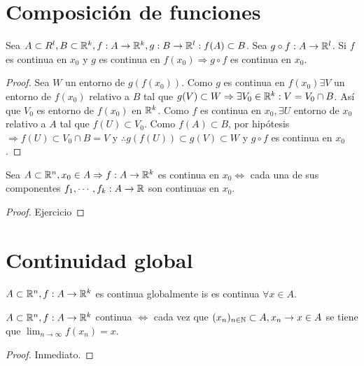 \section{Composición de funciones}

\begin{theorem}
  Sea $A \subset R^l, B \subset \mathbb{R}^k, f: A \to \mathbb{R}^k, g: B \to \mathbb{R}^l : f(A) \subset B$. Sea $g \circ f: A \to \mathbb{R}^l$. Si $f$ es continua en $x_0$ y $g$ es continua en $f(x_0) \Rightarrow g \circ f$ es continua en $x_0$.
  \begin{proof}
    Sea $W$ un entorno de $g(f(x_0))$. Como $g$ es continua en $f(x_0) \exists V$ un entorno de $f(x_0)$ relativo a $B$ tal que $g(V) \subset W \Rightarrow \exists V_0 \in \mathbb{R}^k : V = V_0 \cap B$. Así que $V_0$ es entorno de $f(x_0)$ en $\mathbb{R}^k$. Como $f$ es continua en $x_0, \exists U$ entorno de $x_0$ relativo a $A$ tal que $f(U) \subset V_0$. Como $f(A) \subset B$, por hipótesis $\Rightarrow f(U) \subset V_0 \cap B = V$ y $\therefore g(f(U)) \subset g(V) \subset W$ y $g \circ f$ es continua en $x_0$.
  \end{proof}
\end{theorem}

\begin{prop}
  Sea $A \subset \mathbb{R}^n, x_0 \in A \Rightarrow f: A \to \mathbb{R}^k$ es continua en $x_0 \iff$ cada una de sus componentes $f_1, \cdots, f_k: A \to \mathbb{R}$ son continuas en $x_0$.
  \begin{proof}
    Ejercicio
  \end{proof}
\end{prop}

\section{Continuidad global}

\begin{definition}
  $A \subset \mathbb{R}^n, f: A \to \mathbb{R}^k$ es continua globalmente is es continua $\forall x \in A$.
\end{definition}

\begin{prop}
  $A \subset \mathbb{R}^n, f: A \to \mathbb{R}^k$ continua $\iff$ cada vez que $(x_n)_{n \in \mathbb{N}} \subset A, x_n \to x \in A$ se tiene que $\lim_{n \to \infty} f(x_n) = x$.
  \begin{proof}
    Inmediato.
  \end{proof}
\end{prop}


